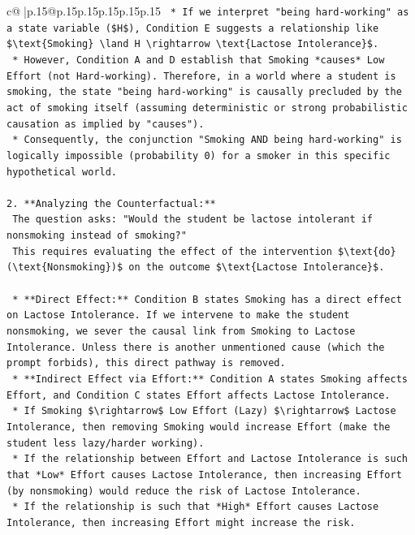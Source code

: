 \documentclass{article}
\begin{document}
{\begin{supertabular}{c@{$\;$}|p{.15\linewidth}@{}p{.15\linewidth}p{.15\linewidth}p{.15\linewidth}p{.15\linewidth}p{.15\linewidth}}
{{{\texttt{        *   If we interpret "being hard{-}working" as a state variable (\$H\$), Condition E suggests a relationship like \$\textbackslash{}text\{Smoking\} \textbackslash{}land H \textbackslash{}rightarrow \textbackslash{}text\{Lactose Intolerance\}\$.} \\
\texttt{        *   However, Condition A and D establish that Smoking *causes* Low Effort (not Hard{-}working). Therefore, in a world where a student is smoking, the state "being hard{-}working" is causally precluded by the act of smoking itself (assuming deterministic or strong probabilistic causation as implied by "causes").} \\
\texttt{        *   Consequently, the conjunction "Smoking AND being hard{-}working" is logically impossible (probability 0) for a smoker in this specific hypothetical world.} \\
\\ 
\texttt{2.  **Analyzing the Counterfactual:**} \\
\texttt{    The question asks: "Would the student be lactose intolerant if nonsmoking instead of smoking?"} \\
\texttt{    This requires evaluating the effect of the intervention \$\textbackslash{}text\{do\}(\textbackslash{}text\{Nonsmoking\})\$ on the outcome \$\textbackslash{}text\{Lactose Intolerance\}\$.} \\
\\ 
\texttt{    *   **Direct Effect:** Condition B states Smoking has a direct effect on Lactose Intolerance. If we intervene to make the student nonsmoking, we sever the causal link from Smoking to Lactose Intolerance. Unless there is another unmentioned cause (which the prompt forbids), this direct pathway is removed.} \\
\texttt{    *   **Indirect Effect via Effort:** Condition A states Smoking affects Effort, and Condition C states Effort affects Lactose Intolerance.} \\
\texttt{        *   If Smoking \$\textbackslash{}rightarrow\$ Low Effort (Lazy) \$\textbackslash{}rightarrow\$ Lactose Intolerance, then removing Smoking would increase Effort (make the student less lazy/harder working).} \\
\texttt{        *   If the relationship between Effort and Lactose Intolerance is such that *Low* Effort causes Lactose Intolerance, then increasing Effort (by nonsmoking) would reduce the risk of Lactose Intolerance.} \\
\texttt{        *   If the relationship is such that *High* Effort causes Lactose Intolerance, then increasing Effort might increase the risk.} \\
}}}
\end{supertabular}}
\end{document}
